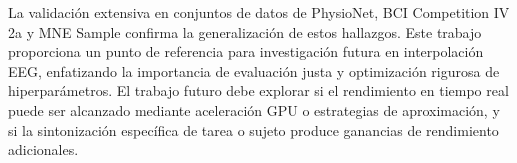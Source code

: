 La validación extensiva en conjuntos de datos de PhysioNet, BCI Competition IV 2a y MNE Sample confirma la generalización de estos hallazgos. Este trabajo proporciona un punto de referencia para investigación futura en interpolación EEG, enfatizando la importancia de evaluación justa y optimización rigurosa de hiperparámetros. El trabajo futuro debe explorar si el rendimiento en tiempo real puede ser alcanzado mediante aceleración GPU o estrategias de aproximación, y si la sintonización específica de tarea o sujeto produce ganancias de rendimiento adicionales.
